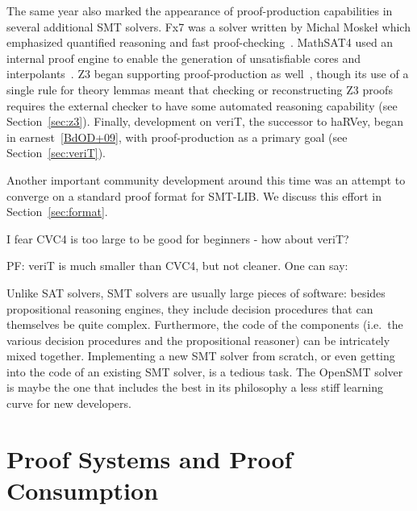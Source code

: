 \documentclass{llncs}
\begin{document}
The same year also marked the appearance of proof-production capabilities in
several additional SMT solvers.  Fx7 was a solver written by Michal Moske\l
which emphasized quantified reasoning and fast proof-checking~\cite{M08}.
MathSAT4 used an internal proof engine to enable the generation of
unsatisfiable cores and interpolants~\cite{BCF+08}.  Z3 began supporting
proof-production as well~\cite{dMB08}, though its use of a single rule for
theory lemmas meant that checking or reconstructing Z3 proofs requires the
external checker to have some automated reasoning capability (see
Section~\ref{sec:z3}).  Finally, development on veriT, the successor to haRVey,
began in earnest~\ref{BdOD+09}, with proof-production as a primary goal (see Section~\ref{sec:veriT}).

Another important community development around this time was an attempt to
converge on a standard proof format for SMT-LIB.  We discuss this effort in
Section~\ref{sec:format}.



I fear CVC4 is too large to be good for beginners - how about veriT?

PF: veriT is much smaller than CVC4, but not cleaner.  One can say:

Unlike SAT solvers, SMT solvers are usually large pieces of software: besides
propositional reasoning engines, they include decision procedures that can
themselves be quite complex.  Furthermore, the code of the components (i.e.\ the
various decision procedures and the propositional reasoner) can be intricately
mixed together.  Implementing a new SMT solver from scratch, or even getting
into the code of an existing SMT solver, is a tedious task.  The OpenSMT
solver~\cite{} is maybe the one that includes the best in its philosophy a less
stiff learning curve for new developers.

\section{Proof Systems and Proof Consumption}
\end{document}
